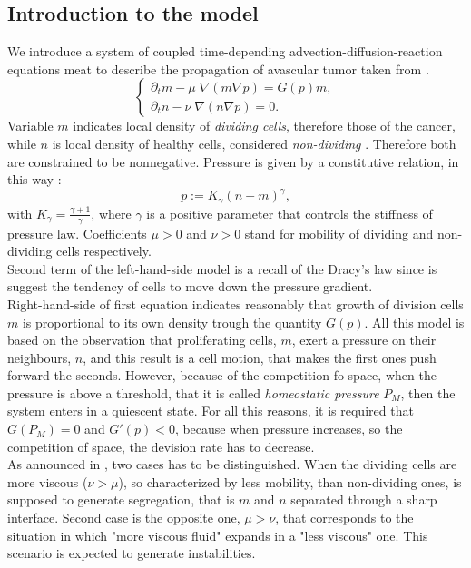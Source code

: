 \subsection {Introduction to the model}
We introduce a system of coupled time-depending advection-diffusion-reaction equations meat to describe the propagation of avascular tumor taken from \cite{tumor_growth}.
\begin{equation}
\label{tumor_system}
\begin{cases}
\partial_t m -\mu \; \nabla (m \nabla p) = G(p) m ,\\
\partial_t n -\nu \; \nabla (n \nabla p) = 0 .
\end{cases}
\end{equation}
Variable $ m $ indicates local density of \textit{dividing cells}, therefore those of the cancer, while $ n $ is local density of healthy cells, considered \textit{non-dividing }. Therefore both are constrained to be nonnegative. Pressure is given by a constitutive relation, in this way :
\begin{equation}
\label{pressure}
p := K_\gamma (n+m)^\gamma,
\end{equation}
with $ K_\gamma = \frac{\gamma + 1}{\gamma} $, where $ \gamma $ is a positive parameter that controls the stiffness of pressure law. Coefficients $ \mu > 0$ and $ \nu > 0 $ stand for mobility of dividing and non-dividing cells  respectively.\\
Second term of the left-hand-side model is a recall of the Dracy's law since is suggest the tendency of cells to move down the pressure gradient.\\
Right-hand-side of first equation indicates reasonably that growth of division cells $ m $ is proportional to its own density trough the quantity $ G(p) $. All this model is based on the observation that proliferating cells, $ m $, exert a pressure on their neighbours, $ n $,  and this result is a cell motion, that makes the first ones push forward the seconds. However, because of the competition fo space, when the pressure is above a threshold, that it is called \textit{homeostatic pressure} $ P_M $, then the system enters in a quiescent state. For all this reasons, it is required that $ G(P_M) = 0 $ and $ G'(p) < 0 $, because when pressure increases, so the competition of space, the devision rate has to decrease. \\
As announced in \cite{tumor_growth}, two cases has to be distinguished. When the dividing cells are more viscous ($ \nu > \mu $), so characterized by less mobility, than non-dividing ones, is supposed to generate segregation, that is $ m $ and $ n $ separated through a sharp interface.
Second case is the opposite one, $ \mu > \nu $, that corresponds to the situation in which "more viscous fluid" expands in a "less viscous" one. This scenario is expected to generate instabilities.\\
